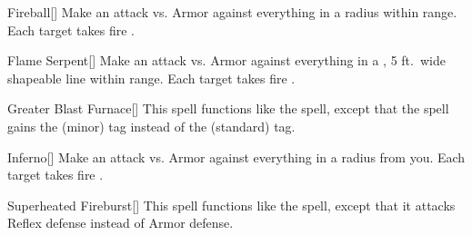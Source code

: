 \lowercase{\hypertarget{spell:Fireball}{}}\label{spell:Fireball}
\begin{apability}[\nth{3}]{\hypertarget{spell:Fireball}{Fireball}}[]
Make an attack vs. Armor against everything in a \areamed radius within \rnglong range.
\hit Each target takes fire .
\end{apability}
\vspace{0.25em}



\lowercase{\hypertarget{spell:Flame Serpent}{}}\label{spell:Flame Serpent}
\begin{apability}[\nth{3}]{\hypertarget{spell:Flame Serpent}{Flame Serpent}}[]
Make an attack vs. Armor against everything in a \arealarge, 5 ft.\ wide shapeable line within \rngmed range.
\hit Each target takes fire .
\end{apability}
\vspace{0.25em}



\lowercase{\hypertarget{spell:Greater Blast Furnace}{}}\label{spell:Greater Blast Furnace}
\begin{apability}[\nth{3}]{\hypertarget{spell:Greater Blast Furnace}{Greater Blast Furnace}}[]
This spell functions like the  spell, except that the spell gains the  (minor) tag instead of the  (standard) tag.
\end{apability}
\vspace{0.25em}



\lowercase{\hypertarget{spell:Inferno}{}}\label{spell:Inferno}
\begin{apability}[\nth{3}]{\hypertarget{spell:Inferno}{Inferno}}[]
Make an attack vs. Armor against everything in a \arealarge radius from you.
\hit Each target takes fire .
\end{apability}
\vspace{0.25em}



\lowercase{\hypertarget{spell:Superheated Fireburst}{}}\label{spell:Superheated Fireburst}
\begin{apability}[\nth{3}]{\hypertarget{spell:Superheated Fireburst}{Superheated Fireburst}}[]
This spell functions like the  spell, except that it attacks Reflex defense instead of Armor defense.
\end{apability}
\vspace{0.25em}



